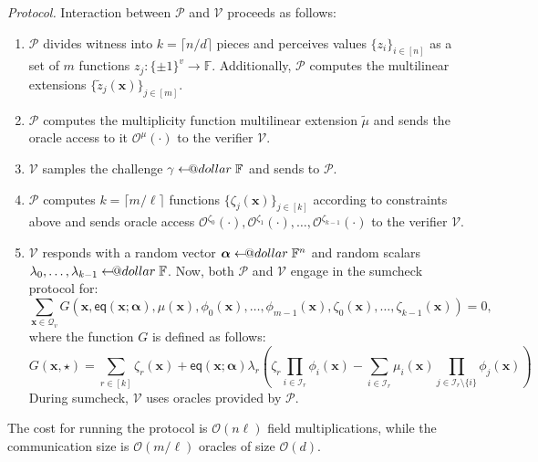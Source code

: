 \documentclass{lookup-template}
\makeatletter
\newcommand\leftarrowS{\leftarrow\joinrel\smalldollar}
\newcommand{\smalldollar}{\mathrel{\mathpalette\small@dollar\relax}}
\newcommand{\small@dollar}[2]{%
  \vcenter{\hbox{%
    $#1\textnormal{\fontsize{0.7\dimexpr\f@size pt}{0}\selectfont\$}$%
  }}%
}
\makeatother
\begin{document}
\textit{Protocol.} Interaction between $\mathcal{P}$ and $\mathcal{V}$ proceeds as follows:
\begin{enumerate}
    \item $\mathcal{P}$ divides witness into $k = \lceil n/d \rceil$ pieces and
    perceives values $\{z_i\}_{i \in [n]}$ as a set of $m$ functions $z_j:
    \{\pm 1\}^v \to \mathbb{F}$. Additionally, $\mathcal{P}$ computes the
    multilinear extensions $\{\widetilde{z}_j(\mathbf{x})\}_{j \in [m]}$.
    \item $\mathcal{P}$ computes the multiplicity function multilinear extension
    $\widetilde{\mu}$ and sends the oracle access to it
    $\mathcal{O}^{\mu}(\cdot)$ to the verifier $\mathcal{V}$.
    \item $\mathcal{V}$ samples the challenge $\gamma \leftarrowS \mathbb{F}$
    and sends to $\mathcal{P}$.
    \item $\mathcal{P}$ computes $k=\lceil m/\ell \rceil$ functions
    $\{\zeta_j(\mathbf{x})\}_{j \in [k]}$ according to constraints above and
    sends oracle access
    $\mathcal{O}^{\zeta_0}(\cdot),\mathcal{O}^{\zeta_1}(\cdot),\dots,\mathcal{O}^{\zeta_{k-1}}(\cdot)$
    to the verifier $\mathcal{V}$.
    \item $\mathcal{V}$ responds with a random vector $\boldsymbol{\alpha} \leftarrowS \mathbb{F}^n$ and 
    random scalars $\lambda_0,\dots,\lambda_{k-1} \leftarrowS \mathbb{F}$. Now, both $\mathcal{P}$ and 
    $\mathcal{V}$ engage in the sumcheck protocol for:
    \begin{equation*}
        \sum_{\mathbf{x} \in \mathcal{Q}_v}G(\mathbf{x}, \mathsf{eq}(\mathbf{x};\boldsymbol{\alpha}),\mu(\mathbf{x}),\phi_0(\mathbf{x}),\dots,\phi_{m-1}(\mathbf{x}),\zeta_0(\mathbf{x}),\dots,\zeta_{k-1}(\mathbf{x})) = 0,
    \end{equation*}
    where the function $G$ is defined as follows:
    \begin{equation*}
        G(\mathbf{x},\star) = \sum_{r \in [k]} \zeta_r(\mathbf{x}) + \mathsf{eq}(\mathbf{x};\boldsymbol{\alpha})\lambda_r\left(\zeta_r\prod_{i \in \mathcal{I}_r}\phi_i(\mathbf{x}) - \sum_{i \in \mathcal{I}_r}\mu_i(\mathbf{x})\prod_{j \in \mathcal{I}_r \setminus \{i\}} \phi_j(\mathbf{x})\right)
    \end{equation*}
    During sumcheck, $\mathcal{V}$ uses oracles provided by $\mathcal{P}$.
\end{enumerate}

\begin{lemma}
    The cost for running the protocol is $\mathcal{O}(n \ell)$
    field multiplications, while the communication size is $\mathcal{O}(m/\ell)$ oracles of size
    $\mathcal{O}(d)$.
\end{lemma}
\end{document}
